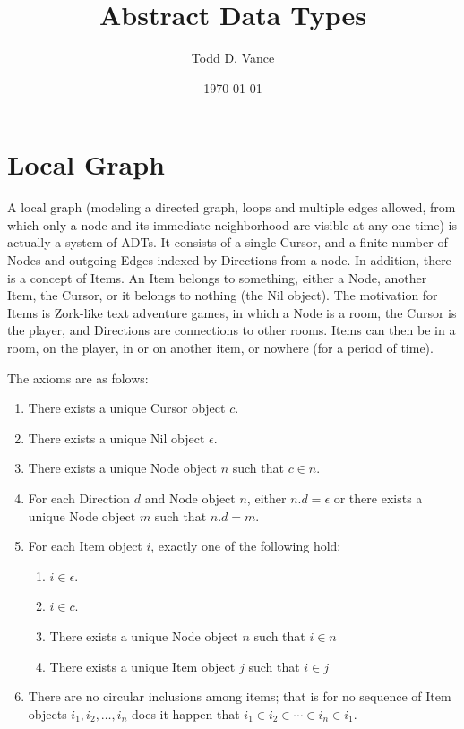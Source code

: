 \documentclass{amsart}
\title{Abstract Data Types}
\author{Todd D. Vance}
\date{\today}
\begin{document}
\maketitle{}

\section{Local Graph}

A local graph (modeling a directed graph, loops and multiple edges allowed, from which only a node and its immediate neighborhood are visible at any one time) is actually a system of ADTs.  It consists of a single Cursor, and a finite number of Nodes and outgoing Edges indexed by Directions from a node.  In addition, there is a concept of Items. An Item belongs to something, either a Node, another Item, the Cursor, or it belongs to nothing (the Nil object). The motivation for Items is Zork-like text adventure games, in which a Node is a room, the Cursor is the player, and Directions are connections to other rooms.  Items can then be in a room, on the player, in or on another item, or nowhere (for a period of time).

The axioms are as folows:

\begin{enumerate}
\item There exists a unique Cursor object $c$.
\item There exists a unique Nil object $\epsilon$.
\item There exists a unique Node object $n$ such that $c\in{n}$.
\item For each Direction $d$ and Node object $n$, either $n.d=\epsilon$ or there exists a unique Node object $m$ such that $n.d=m$.
\item For each Item object $i$, exactly one of the following hold:
\begin{enumerate}
\item $i\in\epsilon$.
\item $i\in{c}$.
\item There exists a unique Node object $n$ such that $i\in{n}$
\item There exists a unique Item object $j$ such that $i\in{j}$
\end{enumerate}
\item There are no circular inclusions among items; that is for no sequence of Item objects $i_1, i_2, \dots, i_n$ does it happen that $i_1\in i_2 \in \cdots\in i_n\in i_1$.
\end{enumerate}
\end{document}
